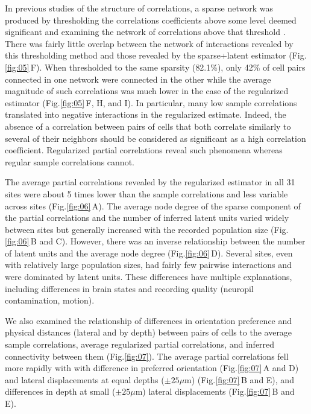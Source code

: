 \documentclass[10pt]{article}
\begin{document}
In previous studies of the structure of correlations, a sparse network was produced by thresholding the correlations coefficients  above some level deemed significant and examining the network of correlations above that threshold \cite{Golshani:2009,Malmersjo:2013}. There was fairly little overlap between the network of interactions revealed by this thresholding method and those revealed by the sparse+latent estimator (Fig.\;\ref{fig:05}\,F). When thresholded to the same sparsity (82.1\%), only 42\% of cell pairs connected in one network were connected in the other while the average magnitude of such correlations was much lower in the case of the regularized estimator (Fig.\;\ref{fig:05}\,F, H, and I). In particular, many low sample correlations translated into negative interactions in the regularized estimate. Indeed, the absence of a correlation between pairs of cells that both correlate similarly to several of their neighbors should be considered as significant as a high correlation coefficient. Regularized partial correlations reveal such phenomena whereas regular sample correlations cannot.

The average partial correlations  revealed by the regularized estimator in all 31 sites were about 5 times lower than the sample correlations and  less variable across sites (Fig.\;\ref{fig:06}\,A). The average node degree of the sparse component of the partial correlations and the number of  inferred latent units varied widely between sites but generally increased with the recorded population size (Fig.\;\ref{fig:06}\,B and C). However, there was an inverse relationship between the number of latent units and the average node degree (Fig.\;\ref{fig:06}\,D). Several sites, even with relatively large population sizes, had fairly few pairwise interactions and were dominated by latent units.  These differences have multiple explanations, including differences in brain states and recording quality (neuropil contamination, motion). 

We also examined the relationship of differences in orientation preference and physical distances (lateral and by depth) between pairs of cells  to the average sample correlations, average regularized partial correlations, and inferred connectivity between them (Fig.\;\ref{fig:07}). The average partial correlations fell more rapidly with with difference in preferred orientation (Fig.\;\ref{fig:07}\,A and D) and lateral displacements at equal depths ($\pm 25\mu$m) (Fig.\;\ref{fig:07}\,B and E), and differences in depth at small ($\pm 25\mu$m) lateral displacements (Fig.\;\ref{fig:07}\,B and E).
\end{document}

